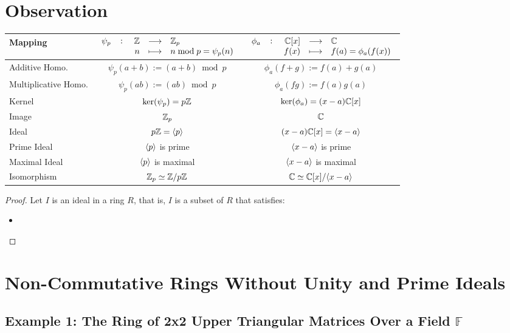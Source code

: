 \section{Observation}
\begin{table}[h!]\centering{}
\begin{tabular}{|l||c|c|} \hline
	\textbf{Mapping} & $\fullfunction{\psi_p}{\Z}{\Z_p}{n}{n\bmod p=\psi_p(n)}$ & $\fullfunction{\phi_a}{\C[x]}{\C}{f(x)}{f(a)=\phi_a(f(x))}$ \\ \hline\hline
	Additive Homo. & $\psi_p(a+b):=(a+b)\bmod p$ & $\phi_a(f+g):=f(a)+g(a)$ \\ \hline
	Multiplicative Homo. & $\psi_p(ab):=(ab)\bmod p$ & $\phi_a(fg):=f(a)g(a)$ \\ \hline
	Kernel & $\ker(\psi_p)=p\mathbb{Z}$ & $\ker(\phi_a)=(x-a)\mathbb{C}[x]$ \\ \hline
	Image & $\mathbb{Z}_p$ & $\mathbb{C}$ \\ \hline
	Ideal & $p\mathbb{Z}=\langle p\rangle$ & $(x-a)\mathbb{C}[x]=\langle x-a\rangle$ \\ \hline
	Prime Ideal & $\langle p\rangle$ is prime & $\langle x-a\rangle$ is prime \\ \hline
	Maximal Ideal & $\langle p\rangle$ is maximal & $\langle x-a\rangle$ is maximal \\ \hline
	Isomorphism & $\mathbb{Z}_p\simeq \mathbb{Z}/p\mathbb{Z}$ & $\mathbb{C}\simeq \mathbb{C}[x]/\langle x-a\rangle$ \\ \hline
\end{tabular}
\end{table}

\begin{proof}
	Let $I$ is an ideal in a ring $R$, that is, $I$ is a subset of $R$ that satisfies: \begin{itemize}
		\item 
	\end{itemize}
\end{proof}
\newpage

\section*{Non-Commutative Rings Without Unity and Prime Ideals}

\subsection*{Example 1: The Ring of 2x2 Upper Triangular Matrices Over a Field \( \mathbb{F} \)}

